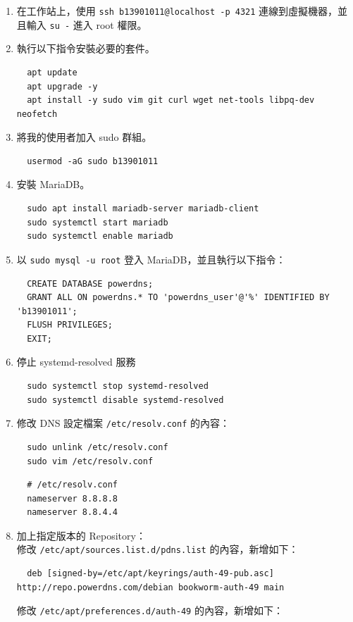 \documentclass[12pt]{article}
\begin{document}
\begin{enumerate}
  \item 在工作站上，使用 \texttt{ssh b13901011@localhost -p 4321} 連線到虛擬機器，並且輸入 \texttt{su -} 進入 root 權限。
  \item 執行以下指令安裝必要的套件。
\begin{verbatim}
  apt update
  apt upgrade -y
  apt install -y sudo vim git curl wget net-tools libpq-dev neofetch
\end{verbatim}
  \item 將我的使用者加入 sudo 群組。
\begin{verbatim}
  usermod -aG sudo b13901011
\end{verbatim}
  \item 安裝 MariaDB。
\begin{verbatim}
  sudo apt install mariadb-server mariadb-client
  sudo systemctl start mariadb
  sudo systemctl enable mariadb
\end{verbatim}
  \item 以 \texttt{sudo mysql -u root} 登入 MariaDB，並且執行以下指令：
\begin{verbatim}
  CREATE DATABASE powerdns;
  GRANT ALL ON powerdns.* TO 'powerdns_user'@'%' IDENTIFIED BY 'b13901011';
  FLUSH PRIVILEGES;
  EXIT;
\end{verbatim}
  \item 停止 systemd-resolved 服務
\begin{verbatim}
  sudo systemctl stop systemd-resolved
  sudo systemctl disable systemd-resolved
\end{verbatim}
  \item 修改 DNS 設定檔案 \texttt{/etc/resolv.conf} 的內容：
\begin{verbatim}
  sudo unlink /etc/resolv.conf
  sudo vim /etc/resolv.conf
\end{verbatim}
    \vspace{-0.5cm}
\begin{verbatim}
  # /etc/resolv.conf
  nameserver 8.8.8.8
  nameserver 8.8.4.4
\end{verbatim}
  \item 加上指定版本的 Repository： \\
    修改 \texttt{/etc/apt/sources.list.d/pdns.list} 的內容，新增如下：
\begin{verbatim}
  deb [signed-by=/etc/apt/keyrings/auth-49-pub.asc] http://repo.powerdns.com/debian bookworm-auth-49 main
\end{verbatim}
    修改 \texttt{/etc/apt/preferences.d/auth-49} 的內容，新增如下：
\begin{verbatim}

\end{verbatim}
\end{enumerate}
\end{document}

